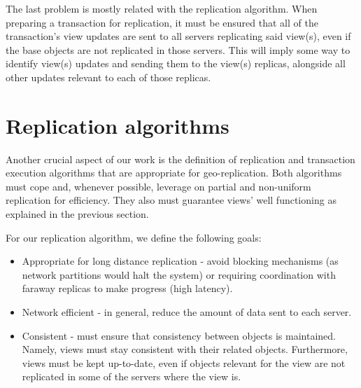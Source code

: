 The last problem is mostly related with the replication algorithm.
When preparing a transaction for replication, it must be ensured that all of the transaction's view updates are sent to all servers replicating said view(s), even if the base objects are not replicated in those servers. 
This will imply some way to identify view(s) updates and sending them to the view(s) replicas, alongside all other updates relevant to each of those replicas.

\section{Replication algorithms}
\label{sec:replication_algorithm}

Another crucial aspect of our work is the definition of replication and transaction execution algorithms that are appropriate for geo-replication.
Both algorithms must cope and, whenever possible, leverage on partial and non-uniform replication for efficiency.
They also must guarantee views' well functioning as explained in the previous section.

For our replication algorithm, we define the following goals:
\begin{itemize}
	\item Appropriate for long distance replication - avoid blocking mechanisms (as network partitions would halt the system) or requiring coordination with faraway replicas to make progress (high latency).
	\item Network efficient - in general, reduce the amount of data sent to each server. 
	\item Consistent - must ensure that consistency between objects is maintained. Namely, views must stay consistent with their related objects.
	Furthermore, views must be kept up-to-date, even if objects relevant for the view are not replicated in some of the servers where the view is.
\end{itemize}

